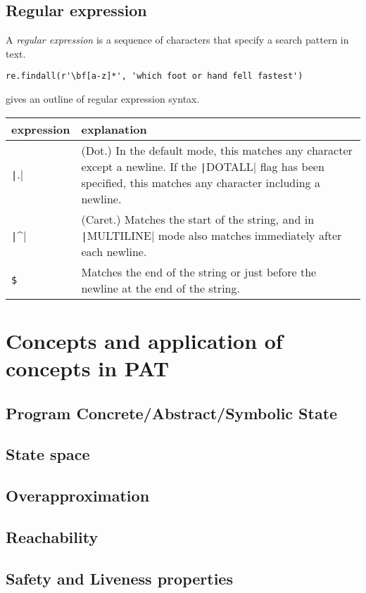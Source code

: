 \documentclass{article}
\begin{document}
\subsection{Regular expression}
A \emph{regular expression} is a sequence of characters that specify a search pattern
in text.
\begin{verbatim}
re.findall(r'\bf[a-z]*', 'which foot or hand fell fastest')
\end{verbatim}
 gives an outline of regular expression syntax.
\begin{table}
\begin{tabular}{l p{10cm}}
expression & explanation\\\toprule
\texttt|.| & (Dot.) In the default mode, this matches any character except a newline. If the \texttt|DOTALL| flag has been specified, this matches any character including a newline.\\\cmidrule{2-2}
\texttt|^| & (Caret.) Matches the start of the string, and in \texttt|MULTILINE| mode also matches immediately after each newline.\\\cmidrule{2-2}
\texttt{\$} & Matches the end of the string or just before the newline at the end of the string. 
\end{tabular}
\end{table} 
\section{Concepts and application of concepts in PAT} 
\subsection{Program Concrete/Abstract/Symbolic State} 
\subsection{State space} 
\subsection{Overapproximation} 
\subsection{Reachability} 
\subsection{Safety and Liveness properties} 
\end{document}
